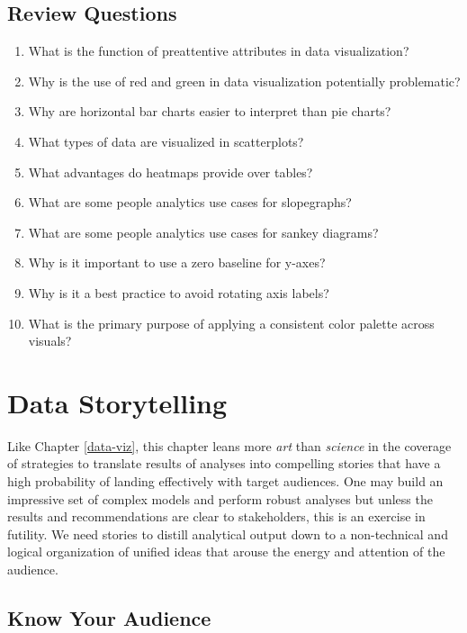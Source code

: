 \documentclass[
]{book}
\begin{document}
\hypertarget{review-questions-13}{%
\section{Review Questions}\label{review-questions-13}}

\begin{enumerate}
\def\labelenumi{\arabic{enumi}.}
\item
  What is the function of preattentive attributes in data visualization?
\item
  Why is the use of red and green in data visualization potentially problematic?
\item
  Why are horizontal bar charts easier to interpret than pie charts?
\item
  What types of data are visualized in scatterplots?
\item
  What advantages do heatmaps provide over tables?
\item
  What are some people analytics use cases for slopegraphs?
\item
  What are some people analytics use cases for sankey diagrams?
\item
  Why is it important to use a zero baseline for y-axes?
\item
  Why is it a best practice to avoid rotating axis labels?
\item
  What is the primary purpose of applying a consistent color palette across visuals?
\end{enumerate}

\hypertarget{storytelling}{%
\chapter{Data Storytelling}\label{storytelling}}

Like Chapter \ref{data-viz}, this chapter leans more \emph{art} than \emph{science} in the coverage of strategies to translate results of analyses into compelling stories that have a high probability of landing effectively with target audiences. One may build an impressive set of complex models and perform robust analyses but unless the results and recommendations are clear to stakeholders, this is an exercise in futility. We need stories to distill analytical output down to a non-technical and logical organization of unified ideas that arouse the energy and attention of the audience.

\hypertarget{know-your-audience}{%
\section{Know Your Audience}\label{know-your-audience}}
\end{document}
